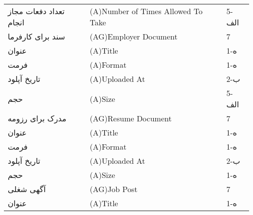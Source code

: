 \documentclass[12pt]{article}
\begin{document}
\begin{table}[]
\begin{tabular}{lll}
			تعداد دفعات مجاز انجام               & (A)Number of Times Allowed To Take                                                                            & 5-الف \\
			سند برای کارفرما                     & (AG)Employer Document                                                                                         & 7     \\
			عنوان                                & (A)Title                                                                                                      & 1-ه   \\
			فرمت                                 & (A)Format                                                                                                     & 1-ه   \\
			تاریخ آپلود                          & (A)Uploaded At                                                                                                & 2-ب   \\
			حجم                                  & (A)Size                                                                                                       & 5-الف \\
			مدرک برای رزومه                      & (AG)Resume Document                                                                                           & 7     \\
			عنوان                                & (A)Title                                                                                                      & 1-ه   \\
			فرمت                                 & (A)Format                                                                                                     & 1-ه   \\
			تاریخ آپلود                          & (A)Uploaded At                                                                                                & 2-ب   \\
			حجم                                  & (A)Size                                                                                                       & 1-ه   \\
			آگهی شغلی                            & (AG)Job Post                                                                                                  & 7     \\
			عنوان                                & (A)Title                                                                                                      & 1-ه   \\

\end{tabular}
\end{table}
\end{document}
